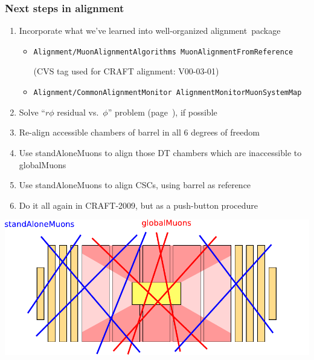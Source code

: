 \documentclass[compress]{beamer}
\begin{document}
\begin{frame}
\frametitle{Next steps in alignment}

\begin{enumerate}
\item Incorporate what we've learned into well-organized \mbox{alignment package\hspace{-1 cm}}
\begin{itemize}
\item \mbox{\scriptsize \tt Alignment/MuonAlignmentAlgorithms MuonAlignmentFromReference\hspace{-5 cm}}

{\scriptsize (CVS tag used for CRAFT alignment: V00-03-01)}

\item \mbox{\scriptsize \tt Alignment/CommonAlignmentMonitor AlignmentMonitorMuonSystemMap\hspace{-5 cm}}
\end{itemize}
\item Solve ``$r\phi$ residual vs.\ $\phi$'' problem (page~\pageref{page:rphivsphi}), if possible
\addtocounter{enumi}{-1}
\item Re-align accessible chambers of barrel in all 6 degrees of freedom
\item Use standAloneMuons to align those DT chambers which are inaccessible to globalMuons
\item Use standAloneMuons to align CSCs, using barrel as reference
\item Do it all again in CRAFT-2009, but as a push-button procedure
\end{enumerate}

\begin{center}
\includegraphics[width=0.65\linewidth]{accessible_to_globalMuons.pdf}
\end{center}
\end{frame}
\end{document}
